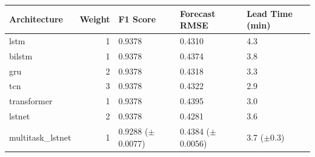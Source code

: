 \begin{tabular}{lrlll}
\toprule
Architecture & Weight & F1 Score & Forecast RMSE & Lead Time (min) \\
\midrule
lstm & 1 & 0.9378 & 0.4310 & 4.3 \\
bilstm & 1 & 0.9378 & 0.4374 & 3.8 \\
gru & 2 & 0.9378 & 0.4318 & 3.3 \\
tcn & 3 & 0.9378 & 0.4322 & 2.9 \\
transformer & 1 & 0.9378 & 0.4395 & 3.0 \\
lstnet & 2 & 0.9378 & 0.4281 & 3.6 \\
multitask_lstnet & 1 & 0.9288 ($\pm$0.0077) & 0.4384 ($\pm$0.0056) & 3.7 ($\pm$0.3) \\
\bottomrule
\end{tabular}
